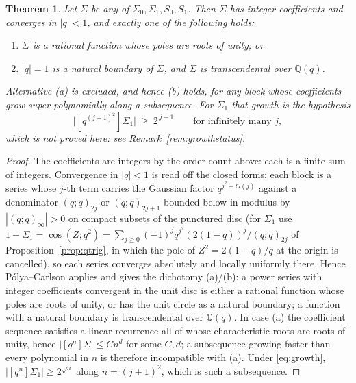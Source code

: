 \documentclass[11pt]{article}
\theoremstyle{plain}
\newtheorem{theorem}{Theorem}
\theoremstyle{definition}
\theoremstyle{remark}
\newcommand{\Q}{\mathbb{Q}}
\begin{document}
\begin{theorem}\label{thm:blocks}
Let $\Sigma$ be any of $\Sigma_0,\Sigma_1,S_0,S_1$. Then $\Sigma$ has integer coefficients and
converges in $|q|<1$, and exactly one of the following holds:
\begin{enumerate}[label=\textup{(\alph*)},leftmargin=2.2em,itemsep=0.1em,topsep=0.2em]
\item $\Sigma$ is a rational function whose poles are roots of unity; or
\item $|q|=1$ is a natural boundary of $\Sigma$, and $\Sigma$ is transcendental over $\Q(q)$.
\end{enumerate}
Alternative \textup{(a)} is excluded, and hence \textup{(b)} holds, for any block whose
coefficients grow super-polynomially along a subsequence. For $\Sigma_1$ that growth is the
hypothesis
\begin{equation}\label{eq:growth}
   \bigl|[q^{(j+1)^2}]\Sigma_1\bigr|\ \ge\ 2^{\,j+1}\qquad\text{for infinitely many }j,
\end{equation}
which is \emph{not proved here}: see Remark~\textup{\ref{rem:growthstatus}}.
\end{theorem}

\begin{proof}
The coefficients are integers by the order count above: each is a finite sum of integers.
Convergence in $|q|<1$ is read off the closed forms: each block is a series whose $j$-th term carries the
Gaussian factor $q^{j^2+O(j)}$ against a denominator $(q;q)_{2j}$ or $(q;q)_{2j+1}$ bounded below
in modulus by $|(q;q)_\infty|>0$ on compact subsets of the punctured disc (for $\Sigma_1$ use
$1-\Sigma_1=\cos(Z;q^2)=\sum_{j\ge0}(-1)^jq^{j^2}(2(1-q))^j/(q;q)_{2j}$ of
Proposition~\ref{prop:qtrig}, in which the pole of $Z^2=2(1-q)/q$ at the origin is cancelled), so
each series converges absolutely and locally uniformly there. Hence
P\'olya--Carlson \cite{Carlson1921} applies and gives the dichotomy \textup{(a)}/\textup{(b)}: a
power series with integer coefficients convergent in the unit disc is either a rational function
whose poles are roots of unity, or has the unit circle as a natural boundary; a function with a
natural boundary is transcendental over $\Q(q)$. In case \textup{(a)} the coefficient sequence
satisfies a linear recurrence all of whose characteristic roots are roots of unity, hence
$|[q^n]\Sigma|\le Cn^d$ for some $C,d$; a subsequence growing faster than every polynomial in $n$
is therefore incompatible with \textup{(a)}. Under \eqref{eq:growth},
$|[q^n]\Sigma_1|\ge2^{\sqrt n}$ along $n=(j+1)^2$, which is such a subsequence.
\end{proof}
\end{document}
